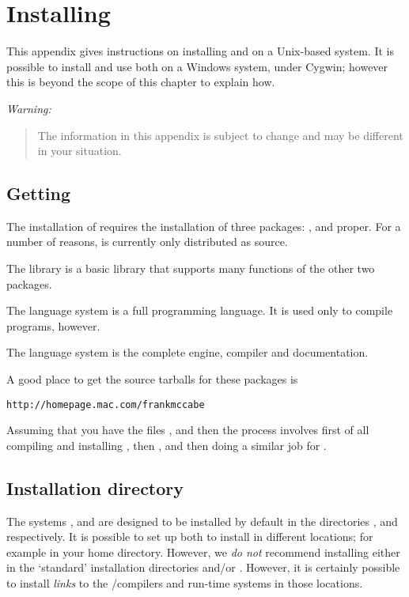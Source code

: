 \chapter{Installing \go}
\label{install}

This appendix gives instructions on installing \go and \april on a Unix-based system. It is possible to install and use both on a Windows system, under Cygwin; however this is beyond the scope of this chapter to explain how.

\emph{Warning:}
\begin{quote}
The information in this appendix is subject to change and may be different in your situation.
\end{quote}

\section{Getting \go}
The installation of \go requires the installation of three packages: , \april and \go proper. For a number of reasons, \go is currently only distributed as source.

The  library is a basic library that supports many functions of the other two packages.

The \april language system is a full programming language. It is used only to compile \go programs, however.

The \go language system is the complete engine, compiler and documentation.

A good place to get the source tarballs for these packages is
\begin{alltt}
http://homepage.mac.com/frankmccabe
\end{alltt}

Assuming that you have the files ,  and  then the process involves first of all compiling and installing , then \april, and then doing a similar job for \go.

\section{Installation directory}
The systems , \april and \go are designed to be installed by default in the directories ,  and  respectively. It is possible to set up both to install in different locations; for example in your home directory. However, we \emph{do not} recommend installing either in the `standard' installation directories  and/or . However, it is certainly possible to install \emph{links} to the \april/\go compilers and run-time systems in those locations.

